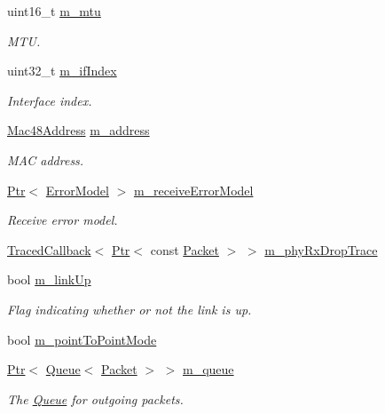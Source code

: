 \begin{DoxyCompactItemize}
uint16\+\_\+t \hyperlink{classns3_1_1SimpleNetDevice_aab2aea73b33a02c23f8d417214a0d2a0}{m\+\_\+mtu}
\begin{DoxyCompactList}\small\item\em M\+TU. \end{DoxyCompactList}\item 
uint32\+\_\+t \hyperlink{classns3_1_1SimpleNetDevice_ac2deeed77b8fcf06389ca7c1b56ac01f}{m\+\_\+if\+Index}
\begin{DoxyCompactList}\small\item\em Interface index. \end{DoxyCompactList}\item 
\hyperlink{classns3_1_1Mac48Address}{Mac48\+Address} \hyperlink{classns3_1_1SimpleNetDevice_ac3dda22026d7c5fbbba243db41e0e2dd}{m\+\_\+address}
\begin{DoxyCompactList}\small\item\em M\+AC address. \end{DoxyCompactList}\item 
\hyperlink{classns3_1_1Ptr}{Ptr}$<$ \hyperlink{classns3_1_1ErrorModel}{Error\+Model} $>$ \hyperlink{classns3_1_1SimpleNetDevice_aabf566ae9e1c8351769da712e7da1177}{m\+\_\+receive\+Error\+Model}
\begin{DoxyCompactList}\small\item\em Receive error model. \end{DoxyCompactList}\item 
\hyperlink{classns3_1_1TracedCallback}{Traced\+Callback}$<$ \hyperlink{classns3_1_1Ptr}{Ptr}$<$ const \hyperlink{classns3_1_1Packet}{Packet} $>$ $>$ \hyperlink{classns3_1_1SimpleNetDevice_a1ff8de95910e13b1fe6c9b5c07a6f721}{m\+\_\+phy\+Rx\+Drop\+Trace}
\item 
bool \hyperlink{classns3_1_1SimpleNetDevice_a923c93f1baab5ab677054a569eb88c53}{m\+\_\+link\+Up}
\begin{DoxyCompactList}\small\item\em Flag indicating whether or not the link is up. \end{DoxyCompactList}\item 
bool \hyperlink{classns3_1_1SimpleNetDevice_a9e0e98464addc8f65a1e95a405b7119c}{m\+\_\+point\+To\+Point\+Mode}
\item 
\hyperlink{classns3_1_1Ptr}{Ptr}$<$ \hyperlink{classns3_1_1Queue}{Queue}$<$ \hyperlink{classns3_1_1Packet}{Packet} $>$ $>$ \hyperlink{classns3_1_1SimpleNetDevice_a72e1e606223c7e4683f64259d14ef065}{m\+\_\+queue}
\begin{DoxyCompactList}\small\item\em The \hyperlink{classns3_1_1Queue}{Queue} for outgoing packets. \end{DoxyCompactList}\item 

\end{DoxyCompactItemize}
